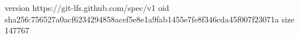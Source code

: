 version https://git-lfs.github.com/spec/v1
oid sha256:756527a0acf6234294858acef5e8e1a9fab1455e7fe8f346cda45f007f23071a
size 147767
